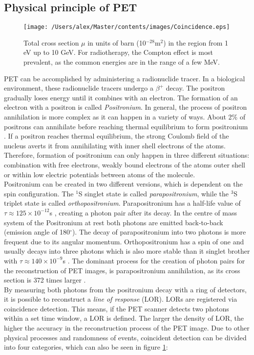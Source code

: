 \subsection{Physical principle of PET}
\begin{figure}[htp]
\centering
\texttt{[image: /Users/alex/Master/contents/images/Coincidence.eps]}
\vspace{1cm}
\caption{Total cross section $\mu$ in units of barn (10$^{-28}$m$^2$) in the region from 1 eV up to 10 GeV. For radiotherapy, the Compton effect is most prevalent, as the common energies are in the range of a few MeV.}
\label{fig:coincidence}
\end{figure}
PET can be accomplished by administering a radionuclide tracer. In a biological environment, these radionuclide tracers undergo a $\beta^+$ decay. The positron gradually loses energy until it combines with an electron. The formation of an electron with a positron is called \textit{Positronium}. In general, the process of positron annihilation is more complex as it can happen in a variety of ways. About 2\% of positrons can annihilate before reaching thermal equilibrium to form positronium \cite{Heitler}. If a positron reaches thermal equilibrium, the strong Coulomb field of the nucleus averts it from annihilating with inner shell electrons of the atoms. Therefore, formation of positronium can only happen in three different situations: combination with free electrons, weakly bound electrons of the atoms outer shell or within low electric potentials between atoms of the molecule.\\Positronium can be created in two different versions, which is dependent on the spin configuration. The $^1$S singlet state is called \textit{parapositronium}, while the $^3$S triplet state is called \textit{orthopositronium}. Parapositronium has a half-life value of $\tau  \approx 125 \times 10^{-12}$s \cite{PDG}, creating a photon pair after its decay. In the centre of mass system of the Positronium at rest both photons are emitted back-to-back (emission angle of 180$^\circ$). The decay of parapositronium into two photons is more frequent due to its angular momentum. Orthopositronium has a spin of one and usually decays into three photons which is also more stable than it singlet brother with $\tau  \approx 140 \times 10^{-9}$s \cite{PDG}. The dominant process for the creation of photon pairs for the reconstruction of PET images, is parapositronium annihilation, as its cross section is 372 times larger \cite{Musiol}.\\By measuring both photons from the positronium decay with a ring of detectors, it is possible to reconstruct a \textit{line of response} (LOR). LORs are registered via coincidence detection. This means, if the PET scanner detects two photons within a set time window, a LOR is defined. The larger the density of LOR, the higher the accuracy in the reconstruction process of the PET image. Due to other physical processes and randomness of events, coincident detection can be divided into four categories, which can also be seen in figure \ref{fig:coincidence}:
